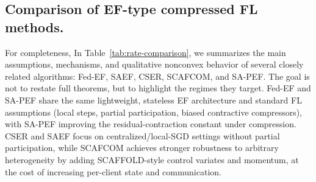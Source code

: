 \documentclass{article} %
\begin{document}
\subsection{Comparison of EF-type compressed FL methods.}
For completeness, In Table~\ref{tab:rate-comparison}, we summarizes the main assumptions, mechanisms, and qualitative nonconvex behavior of several closely related algorithms: Fed-EF, SAEF, CSER, SCAFCOM, and SA-PEF. The goal is not to restate full theorems, but to highlight the regimes they target. Fed-EF and SA-PEF share the same lightweight, stateless EF architecture and standard FL assumptions (local steps, partial participation, biased contractive compressors), with SA-PEF improving the residual-contraction constant under compression. CSER and SAEF focus on centralized/local-SGD settings without partial participation, while SCAFCOM achieves stronger robustness to arbitrary heterogeneity by adding SCAFFOLD-style control variates and momentum, at the cost of increasing per-client state and communication.
\end{document}
